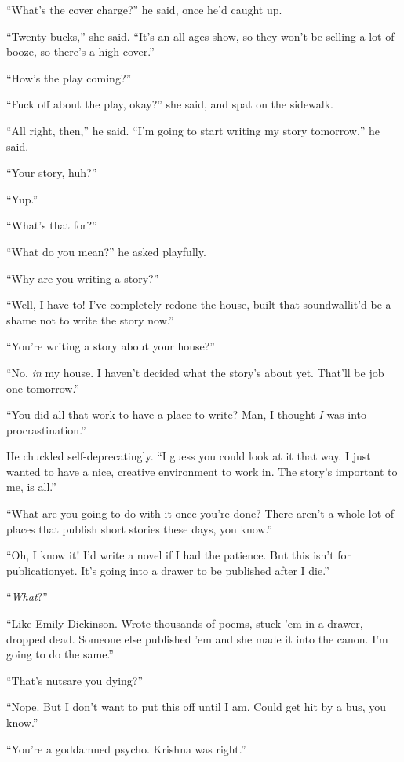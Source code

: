 ``What's the cover charge?'' he said, once he'd caught up.

``Twenty bucks,'' she said.  ``It's an all-ages show, so they won't be
selling a lot of booze, so there's a high cover.''

``How's the play coming?''

``Fuck off about the play, okay?'' she said, and spat on the sidewalk.

``All right, then,'' he said.  ``I'm going to start writing my story
tomorrow,'' he said.

``Your story, huh?''

``Yup.''

``What's that for?''

``What do you mean?'' he asked playfully.

``Why are you writing a story?''

``Well, I have to!  I've completely redone the house, built that
soundwall\dash{}it'd be a shame not to write the story now.''

``You're writing a story about your house?''

``No, \textit{in} my house.  I haven't decided what the story's about
yet.  That'll be job one tomorrow.''

``You did all that work to have a place to write?  Man, I thought
\textit{I} was into procrastination.''

He chuckled self-deprecatingly.  ``I guess you could look at it that
way.  I just wanted to have a nice, creative environment to work in. 
The story's important to me, is all.''

``What are you going to do with it once you're done?  There aren't a
whole lot of places that publish short stories these days, you know.''

``Oh, I know it!  I'd write a novel if I had the patience.  But this
isn't for publication\dash{}yet.  It's going into a drawer to be published
after I die.''

``\textit{What}?''

``Like Emily Dickinson.  Wrote thousands of poems, stuck 'em in a
drawer, dropped dead.  Someone else published 'em and she made it into
the canon.  I'm going to do the same.''

``That's nuts\dash{}are you dying?''

``Nope.  But I don't want to put this off until I am.  Could get hit
by a bus, you know.''

``You're a goddamned psycho.  Krishna was right.''

